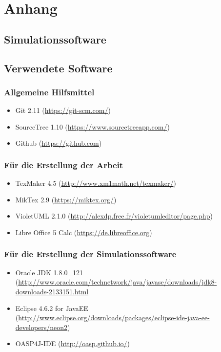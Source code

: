 \section*{Anhang}
\subsection*{Simulationssoftware}
\steffen

\subsection*{Verwendete Software}
\subsubsection*{Allgemeine Hilfsmittel}
\begin{itemize}
	\item Git 2.11 (\url{https://git-scm.com/})
	\item SourceTree 1.10 (\url{https://www.sourcetreeapp.com/})
	\item Github (\url{https://github.com})
\end{itemize}
\subsubsection*{Für die Erstellung der Arbeit}
\begin{itemize}
	\item TexMaker 4.5 (\url{http://www.xm1math.net/texmaker/})
	\item MikTex 2.9 (\url{https://miktex.org/})
	\item VioletUML 2.1.0 (\url{http://alexdp.free.fr/violetumleditor/page.php})
	\item Libre Office 5 Calc (\url{https://de.libreoffice.org})
\end{itemize}
\subsubsection*{Für die Erstellung der Simulationssoftware}
\begin{itemize}
	\item Oracle JDK 1.8.0\_121  (\url{http://www.oracle.com/technetwork/java/javase/downloads/jdk8-downloads-2133151.html}
	\item Eclipse 4.6.2 for JavaEE (\url{http://www.eclipse.org/downloads/packages/eclipse-ide-java-ee-developers/neon2})
	\item OASP4J-IDE (\url{http://oasp.github.io/})
\end{itemize}